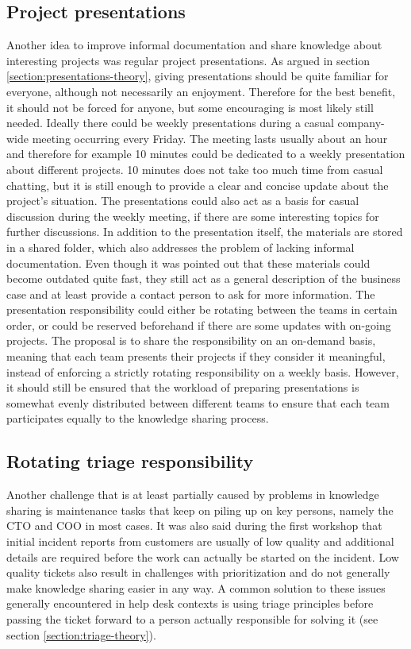 \subsection{Project presentations}

Another idea to improve informal documentation and share knowledge about interesting projects was regular project presentations. As argued in section \ref{section:presentations-theory},
giving presentations should be quite familiar for everyone, although not necessarily an enjoyment. Therefore for the best benefit, it should not be forced for anyone, but some encouraging
is most likely still needed. Ideally there could be weekly presentations during a casual company-wide meeting occurring every
Friday. The meeting lasts usually about an hour and therefore for example 10 minutes could be dedicated to a weekly presentation about different projects. 10 minutes does not take too much time
from casual chatting, but it is still enough to provide a clear and concise update about the project's situation. The presentations could also act as a basis for casual discussion during the
weekly meeting, if there are some interesting topics for further discussions. In addition to the presentation itself, the materials are stored in a shared folder, which also addresses
the problem of lacking informal documentation. Even though it was pointed out that these materials could become outdated quite fast, they still act as a general description of the business case
and at least provide a contact person to ask for more information. The presentation responsibility could either be rotating between the teams in certain
order, or could be reserved beforehand if there are some updates with on-going projects. The proposal is to share the responsibility on an on-demand basis, meaning that each team presents
their projects if they consider it meaningful, instead of enforcing a strictly rotating responsibility on a weekly basis. However, it should still be ensured that the workload of preparing
presentations is somewhat evenly distributed between different teams to ensure that each team participates equally to the knowledge sharing process.

\subsection{Rotating triage responsibility}

Another challenge that is at least partially caused by problems in knowledge sharing is maintenance tasks that keep on piling up on key persons, namely the CTO and COO in most cases.
It was also said during the first workshop that initial incident reports from customers are usually of low quality and additional details are required before the work can actually be started
on the incident. Low quality tickets also result in challenges with prioritization and do not generally make knowledge sharing easier in any way. A common solution to these issues
generally encountered in help desk contexts is using triage principles before passing the ticket forward to a person actually responsible for solving it (see section \ref{section:triage-theory}).

